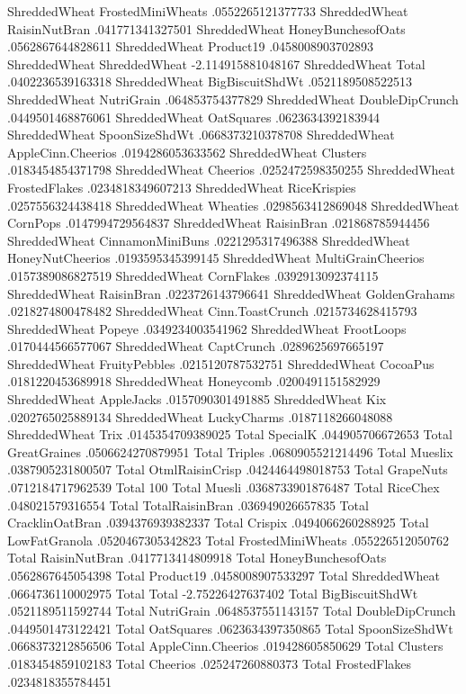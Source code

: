 ShreddedWheat	FrostedMiniWheats	.0552265121377733
ShreddedWheat	RaisinNutBran	.041771341327501
ShreddedWheat	HoneyBunchesofOats	.0562867644828611
ShreddedWheat	Product19	.0458008903702893
ShreddedWheat	ShreddedWheat	-2.114915881048167
ShreddedWheat	Total	.0402236539163318
ShreddedWheat	BigBiscuitShdWt	.0521189508522513
ShreddedWheat	NutriGrain	.064853754377829
ShreddedWheat	DoubleDipCrunch	.0449501468876061
ShreddedWheat	OatSquares	.0623634392183944
ShreddedWheat	SpoonSizeShdWt	.0668373210378708
ShreddedWheat	AppleCinn.Cheerios	.0194286053633562
ShreddedWheat	Clusters	.0183454854371798
ShreddedWheat	Cheerios	.0252472598350255
ShreddedWheat	FrostedFlakes	.0234818349607213
ShreddedWheat	RiceKrispies	.0257556324438418
ShreddedWheat	Wheaties	.0298563412869048
ShreddedWheat	CornPops	.0147994729564837
ShreddedWheat	RaisinBran	.021868785944456
ShreddedWheat	CinnamonMiniBuns	.0221295317496388
ShreddedWheat	HoneyNutCheerios	.0193595345399145
ShreddedWheat	MultiGrainCheerios	.0157389086827519
ShreddedWheat	CornFlakes	.0392913092374115
ShreddedWheat	RaisinBran	.0223726143796641
ShreddedWheat	GoldenGrahams	.0218274800478482
ShreddedWheat	Cinn.ToastCrunch	.0215734628415793
ShreddedWheat	Popeye	.0349234003541962
ShreddedWheat	FrootLoops	.0170444566577067
ShreddedWheat	CaptCrunch	.0289625697665197
ShreddedWheat	FruityPebbles	.0215120787532751
ShreddedWheat	CocoaPus	.0181220453689918
ShreddedWheat	Honeycomb	.0200491151582929
ShreddedWheat	AppleJacks	.0157090301491885
ShreddedWheat	Kix	.0202765025889134
ShreddedWheat	LuckyCharms	.0187118266048088
ShreddedWheat	Trix	.0145354709389025
Total	SpecialK	.044905706672653
Total	GreatGraines	.0506624270879951
Total	Triples	.0680905521214496
Total	Mueslix	.0387905231800507
Total	OtmlRaisinCrisp	.0424464498018753
Total	GrapeNuts	.0712184717962539
Total	100%
Total	Muesli	.0368733901876487
Total	RiceChex	.048021579316554
Total	TotalRaisinBran	.036949026657835
Total	CracklinOatBran	.0394376939382337
Total	Crispix	.0494066260288925
Total	LowFatGranola	.0520467305342823
Total	FrostedMiniWheats	.055226512050762
Total	RaisinNutBran	.0417713414809918
Total	HoneyBunchesofOats	.0562867645054398
Total	Product19	.0458008907533297
Total	ShreddedWheat	.0664736110002975
Total	Total	-2.75226427637402
Total	BigBiscuitShdWt	.0521189511592744
Total	NutriGrain	.0648537551143157
Total	DoubleDipCrunch	.0449501473122421
Total	OatSquares	.0623634397350865
Total	SpoonSizeShdWt	.0668373212856506
Total	AppleCinn.Cheerios	.019428605850629
Total	Clusters	.0183454859102183
Total	Cheerios	.025247260880373
Total	FrostedFlakes	.0234818355784451

